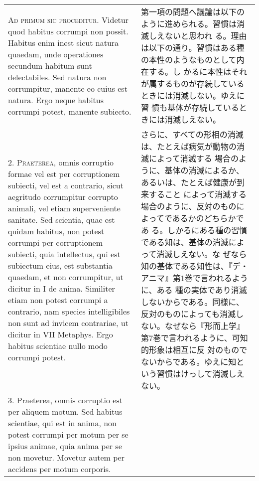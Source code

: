 \documentclass[10pt]{jsarticle} %
\begin{document}
\begin{longtable}{p{21em}p{21em}}


{\scshape Ad primum sic proceditur}. Videtur quod habitus corrumpi non
possit. Habitus enim inest sicut natura quaedam, unde operationes
secundum habitum sunt delectabiles. Sed natura non corrumpitur,
manente eo cuius est natura. Ergo neque habitus corrumpi potest,
manente subiecto.

&

第一項の問題へ議論は以下のように進められる。習慣は消滅しえないと思われ
る。理由は以下の通り。習慣はある種の本性のようなものとして内在する。し
かるに本性はそれが属するものが存続しているときには消滅しない。ゆえに習
慣も基体が存続しているときには消滅しえない。

\\



2. {\scshape Praeterea}, omnis corruptio formae vel est per corruptionem subiecti,
vel est a contrario, sicut aegritudo corrumpitur corrupto animali, vel
etiam superveniente sanitate. Sed scientia, quae est quidam habitus,
non potest corrumpi per corruptionem subiecti, quia intellectus, qui
est subiectum eius, est substantia quaedam, et non corrumpitur, ut
dicitur in I de anima. Similiter etiam non potest corrumpi a
contrario, nam species intelligibiles non sunt ad invicem contrariae,
ut dicitur in VII Metaphys. Ergo habitus scientiae nullo modo corrumpi
potest.


&

さらに、すべての形相の消滅は、たとえば病気が動物の消滅によって消滅する
場合のように、基体の消滅によるか、あるいは、たとえば健康が到来すること
によって消滅する場合のように、反対のものによってであるかのどちらかであ
る。しかるにある種の習慣である知は、基体の消滅によって消滅しえない。な
ぜなら知の基体である知性は、『デ・アニマ』第1巻で言われるように、ある
種の実体であり消滅しないからである。同様に、反対のものによっても消滅し
ない。なぜなら『形而上学』第7巻で言われるように、可知的形象は相互に反
対のものでないからである。ゆえに知という習慣はけっして消滅しえない。



\\



3. Praeterea, omnis corruptio est per aliquem motum. Sed habitus
scientiae, qui est in anima, non potest corrumpi per motum per se
ipsius animae, quia anima per se non movetur. Movetur autem per
accidens per motum corporis. 



\end{longtable}
\end{document}
